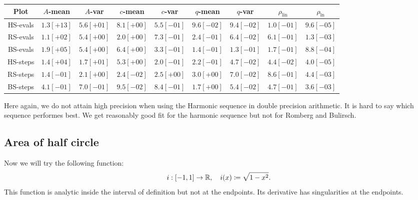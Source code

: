 \begin{table}[H]
    \centering
    \small
    \begin{tabular}{c||c|c|c|c|c|c|c|c}
Plot & \(A\)-mean & \(A\)-var & \(c\)-mean & \(c\)-var & \(q\)-mean & \(q\)-var & \(\rho_{\operatorname{lin}}\) & \(\rho_{\ln}\)\\\hline
\rowcolor{yellow}
HS-evals & \(1.3[+13]\) & \(5.6[+01]\) & \(8.1[+00]\) & \(5.5[-01]\) & \(9.6[-02]\) & \(9.4[-02]\) & \(1.0[-01]\) & \(9.6[-05]\) \\
\rowcolor{red}
RS-evals & \(1.1[+02]\) & \(5.4[+00]\) & \(2.0[+00]\) & \(7.3[-01]\) & \(2.4[-01]\) & \(6.4[-02]\) & \(6.1[-01]\) & \(1.3[-03]\) \\
\rowcolor{red}
BS-evals & \(1.9[+05]\) & \(5.4[+00]\) & \(6.4[+00]\) & \(3.3[-01]\) & \(1.4[-01]\) & \(1.3[-01]\) & \(1.7[-01]\) & \(8.8[-04]\) \\
\rowcolor{yellow}
HS-steps & \(1.4[+04]\) & \(1.7[+01]\) & \(5.3[+00]\) & \(2.0[-01]\) & \(2.2[-01]\) & \(4.7[-02]\) & \(4.4[-02]\) & \(4.0[-05]\) \\
\rowcolor{red}
RS-steps & \(1.4[-01]\) & \(2.1[+00]\) & \(2.4[-02]\) & \(2.5[+00]\) & \(3.0[+00]\) & \(7.0[-02]\) & \(8.6[-01]\) & \(4.4[-03]\) \\
\rowcolor{red}
BS-steps & \(4.1[-01]\) & \(7.0[-01]\) & \(9.5[-02]\) & \(8.4[-01]\) & \(1.7[+00]\) & \(5.4[-02]\) & \(4.7[-01]\) & \(3.6[-03]\) \\
    \end{tabular}
    \label{tab:my_label}
\end{table}

Here again, we do not attain high precision when using the Harmonic sequence in double precision arithmetic. It is hard to say which sequence performes best. We get reasonably good fit for the harmonic sequence but not for Romberg and Bulirsch.

\subsection{Area of half circle}

Now we will try the following function:
\[
i: [-1, 1] \rightarrow \mathbb{R}, \quad i(x)\coloneqq \sqrt{1-x^2}.
\]
This function is analytic inside the interval of definition but not at the endpoints. Its derivative has singularities at the endpoints.

